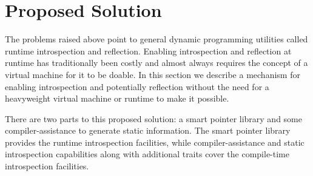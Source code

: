 \section{Proposed Solution}

The problems raised above point to general dynamic programming utilities called
runtime introspection and reflection. Enabling introspection and reflection at
runtime has traditionally been costly and almost always requires the concept of
a virtual machine for it to be doable. In this section we describe a mechanism
for enabling introspection and potentially reflection without the need for a
heavyweight virtual machine or runtime to make it possible.

There are two parts to this proposed solution: a smart pointer library and some
compiler-assistance to generate static information. The smart pointer library
provides the runtime introspection facilities, while compiler-assistance and
static introspection capabilities along with additional traits cover the
compile-time introspection facilities.



